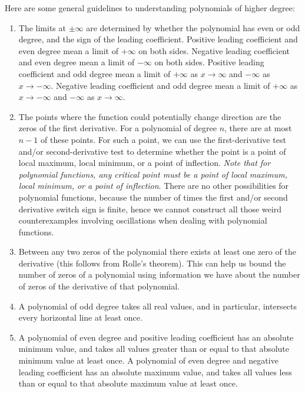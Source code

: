 \documentclass[10pt]{amsart}
\begin{document}
Here are some general guidelines to understanding polynomials of
higher degree:

\begin{enumerate}
\item The limits at $\pm \infty$ are determined by whether the
  polynomial has even or odd degree, and the sign of the leading
  coefficient. Positive leading coefficient and even degree mean a
  limit of $+\infty$ on both sides. Negative leading coefficient and
  even degree mean a limit of $-\infty$ on both sides. Positive
  leading coefficient and odd degree mean a limit of $+\infty$ as $x
  \to \infty$ and $-\infty$ as $x \to -\infty$. Negative leading
  coefficient and odd degree mean a limit of $+\infty$ as $x \to
  -\infty$ and $-\infty$ as $x \to \infty$.
\item The points where the function could potentially change direction
  are the zeros of the first derivative. For a polynomial of degree
  $n$, there are at most $n - 1$ of these points. For such a point, we
  can use the first-derivative test and/or second-derivative test to
  determine whether the point is a point of local maximum, local
  minimum, or a point of inflection. {\em Note that for polynomial
  functions, any critical point must be a point of local maximum,
  local minimum, or a point of inflection}. There are no other
  possibilities for polynomial functions, because the number of times
  the first and/or second derivative switch sign is finite, hence we
  cannot construct all those weird counterexamples involving
  oscillations when dealing with polynomial functions.
\item Between any two zeros of the polynomial there exists at least
  one zero of the derivative (this follows from Rolle's theorem). This
  can help us bound the number of zeros of a polynomial using
  information we have about the number of zeros of the derivative of
  that polynomial.
\item A polynomial of odd degree takes all real values, and in
  particular, intersects every horizontal line at least once.
\item A polynomial of even degree and positive leading coefficient has
  an absolute minimum value, and takes all values greater than or
  equal to that absolute minimum value at least once. A polynomial of
  even degree and negative leading coefficient has an absolute maximum
  value, and takes all values less than or equal to that absolute
  maximum value at least once.
\end{enumerate}
\end{document}
